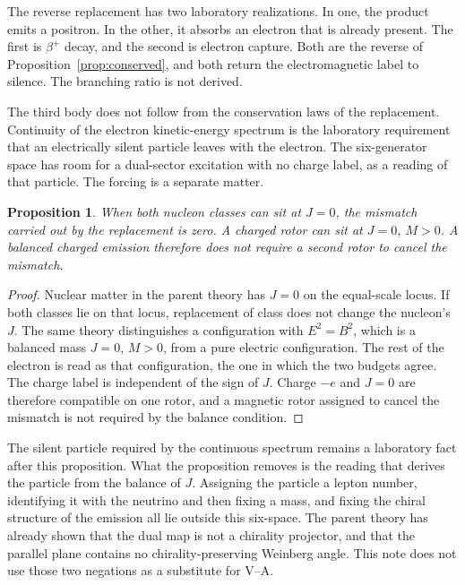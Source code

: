 \documentclass[a4paper]{article}
\newtheorem{proposition}[lemma]{Proposition}
\begin{document}
The reverse replacement has two laboratory realizations. In one, the product emits a positron. In the other, it absorbs an electron that is already present. The first is \(\beta^{+}\) decay, and the second is electron capture. Both are the reverse of Proposition~\ref{prop:conserved}, and both return the electromagnetic label to silence. The branching ratio is not derived.

The third body does not follow from the conservation laws of the replacement. Continuity of the electron kinetic-energy spectrum is the laboratory requirement that an electrically silent particle leaves with the electron. The six-generator space has room for a dual-sector excitation with no charge label, as a reading of that particle. The forcing is a separate matter.

\begin{proposition}
\label{prop:no-third}
When both nucleon classes can sit at \(J=0\), the mismatch carried out by the replacement is zero. A charged rotor can sit at \(J=0\), \(M>0\). A balanced charged emission therefore does not require a second rotor to cancel the mismatch.
\end{proposition}

\begin{proof}
Nuclear matter in the parent theory has \(J=0\) on the equal-scale locus. If both classes lie on that locus, replacement of class does not change the nucleon's \(J\). The same theory distinguishes a configuration with \(E^{2}=B^{2}\), which is a balanced mass \(J=0\), \(M>0\), from a pure electric configuration. The rest of the electron is read as that configuration, the one in which the two budgets agree. The charge label is independent of the sign of \(J\). Charge \(-e\) and \(J=0\) are therefore compatible on one rotor, and a magnetic rotor assigned to cancel the mismatch is not required by the balance condition.
\end{proof}

The silent particle required by the continuous spectrum remains a laboratory fact after this proposition. What the proposition removes is the reading that derives the particle from the balance of \(J\). Assigning the particle a lepton number, identifying it with the neutrino and then fixing a mass, and fixing the chiral structure of the emission all lie outside this six-space. The parent theory has already shown that the dual map is not a chirality projector, and that the parallel plane contains no chirality-preserving Weinberg angle. This note does not use those two negations as a substitute for V--A.
\end{document}
